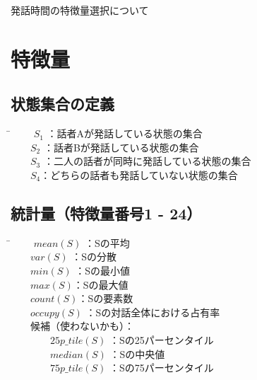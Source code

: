 \documentclass[10pt]{jsarticle}
\begin{document}
\begin{center}
{\LARGE 発話時間の特徴量選択について}\\
\end{center}
\section{特徴量}
\subsection{状態集合の定義}
\noindent
\begin{tabbing}
\hspace{20mm} \= \hspace{15mm} \kill
\ \ \ \ $S_1$ \>：話者Aが発話している状態の集合\\
\ \ \ \ $S_2$ \>：話者Bが発話している状態の集合\\
\ \ \ \ $S_3$\> ：二人の話者が同時に発話している状態の集合\\
\ \ \ \ $S_4$\>：どちらの話者も発話していない状態の集合\\
\end{tabbing}
\subsection{統計量（特徴量番号1 - 24）}
\begin{tabbing}
\hspace{40mm} \= \hspace{15mm} \kill
\ \ \ \ $mean(S)$ \>：Sの平均\\
\ \ \ \ $var(S)$ \>：Sの分散\\
\ \ \ \ $min(S)$\> ：Sの最小値\\
\ \ \ \ $max(S)$\>：Sの最大値\\
\ \ \ \ $count(S)$\>：Sの要素数\\
\ \ \ \ $occupy(S)$ \> ：Sの対話全体における占有率\\
\ \ \ \ 候補（使わないかも）：\\
\ \ \ \ \ \ \ \ $25p\_tile(S)$ \> ：Sの25パーセンタイル\\
\ \ \ \ \ \ \ \ $median(S)$ \> ：Sの中央値\\
\ \ \ \ \ \ \ \ $75p\_tile(S)$ \> ：Sの75パーセンタイル\\
\end{tabbing}
\end{document}
